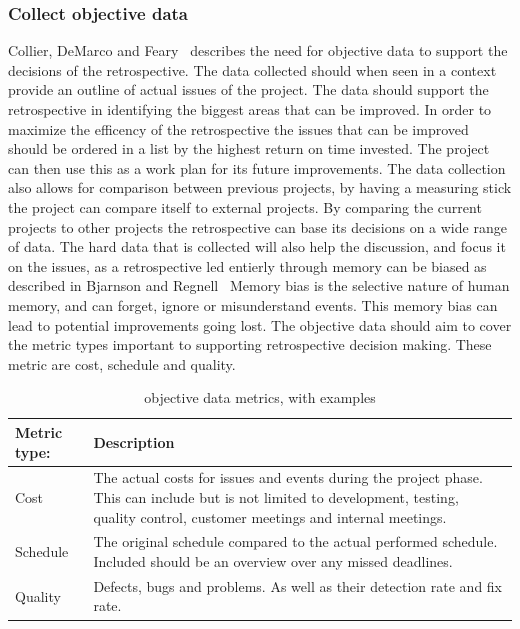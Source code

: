 \documentclass[12pt]{article}
\begin{document}
\subsubsection{Collect objective data} Collier, DeMarco and Feary~\cite{Collier1996} describes the need for objective data to support the decisions of the retrospective. The data collected should when seen in a context provide an outline of actual issues of the project. The data should support the retrospective in identifying the biggest areas that can be improved. In order to maximize the efficency of the retrospective the issues that can be improved should be ordered in a list by the highest return on time invested. The project can then use this as a work plan for its future improvements. The data collection also allows for comparison between previous projects, by having a measuring stick the project can compare itself to external projects. By comparing the current projects to other projects the retrospective can base its decisions on a wide range of data. The hard data that is collected will also help the discussion, and focus it on the issues, as a retrospective led entierly through memory can be biased as described in Bjarnson and Regnell~\cite{Bjarnson2012} Memory bias is the selective nature of human memory, and can forget, ignore or misunderstand events. This memory bias can lead to potential improvements going lost. The objective data should aim to cover the metric types important to supporting retrospective decision making. These metric are cost, schedule and quality.

\begin{table}[!h]
	\centering
	\captionsetup{justification=centering}
	\caption{objective data metrics, with examples}
	\label{table:objective_data_metrics}
	\begin{tabular}{| l | p{} |}
		\hline
		Metric type: & Description \\ \hline
		Cost & The actual costs for issues and events during the project phase. This can include but is not limited to development, testing, quality control, customer meetings and internal meetings. \\ \hline
		Schedule & The original schedule compared to the actual performed schedule. Included should be an overview over any missed deadlines. \\ \hline
		Quality & Defects, bugs and problems. As well as their detection rate and fix rate. \\   
		\hline
	\end{tabular}
\end{table}
\end{document}
